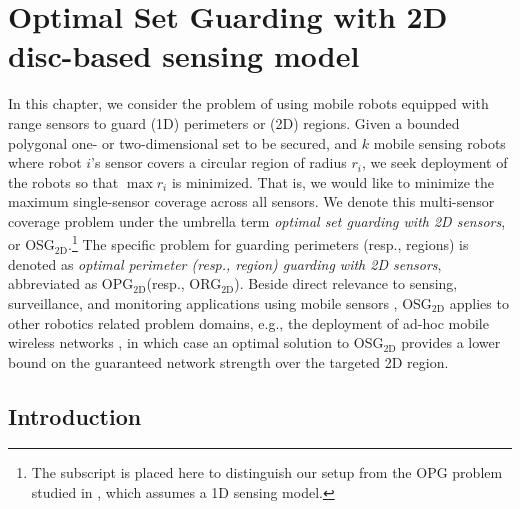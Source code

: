
\chapter{Optimal Set Guarding with 2D disc-based sensing model}
\thispagestyle{myheadings}

\def\R{\mathbf{R}}
\def\C{\mathcal C}
\def\W{\mathcal W}

\def\opt{\textsc{OPT}\xspace}

\def\osgt{\textsc{OSG${}_{\mathrm{2D}}$}\xspace}

\def\opg{\textsc{OPG}\xspace}
\def\opgt{\textsc{OPG${}_{\mathrm{2D}}$}\xspace}
\def\orgt{\textsc{{ORG}${}_{\mathrm{2D}}$}\xspace}
\def\dopgt{\textsc{{D-OPG}${}_{\mathrm{2D}}$}\xspace}
\def\dorgt{\textsc{{D-ORG}${}_{\mathrm{2D}}$}\xspace}


In this chapter, we consider the problem of using mobile robots equipped 
with range sensors to guard (1D) perimeters or (2D) regions. Given 
a bounded polygonal one- or two-dimensional set to be secured, 
and $k$ mobile sensing robots where robot $i$'s sensor covers a circular region of 
radius $r_i$, we seek deployment of the robots so that $\max r_i$ is 
minimized. That is, we would like to minimize the maximum single-sensor 
coverage across all sensors. We denote this multi-sensor coverage problem 
under the umbrella term {\em optimal set guarding with 2D sensors}, or 
\osgt.\footnote{The subscript is placed here to distinguish our setup 
from the \opg problem studied in \cite{fenghangaoyu2019efficient}, which assumes 
a 1D sensing model.} The specific problem for guarding
perimeters (resp., regions) is denoted as {\em optimal perimeter 
(resp., region) guarding with 2D sensors}, abbreviated as \opgt (resp., 
\orgt). Beside direct relevance to sensing, surveillance, and monitoring 
applications using mobile sensors \cite{batalin2002spreading,
cortes2004coverage,fenghangaoyu2019efficient}, \osgt applies to other robotics
related problem domains, e.g., the deployment of ad-hoc mobile wireless 
networks \cite{correll2009ad,gil2012communication}, in which case an 
optimal solution to \osgt provides a lower bound on the guaranteed network 
strength over the targeted 2D region. 

\section{Introduction}\label{sec:osg-intro}


